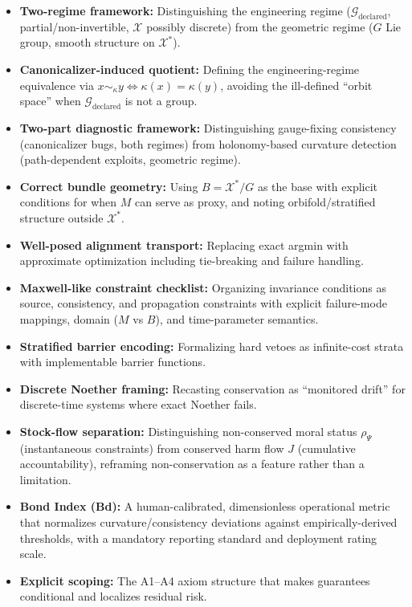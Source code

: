 \documentclass[12pt]{article}
\begin{document}
\begin{itemize}
\item \textbf{Two-regime framework:} Distinguishing the engineering regime ($\mathcal{G}_{\text{declared}}$, partial/non-invertible, $\mathcal{X}$ possibly discrete) from the geometric regime ($G$ Lie group, smooth structure on
$\mathcal{X}^*$).
\item \textbf{Canonicalizer-induced quotient:} Defining the engineering-regime equivalence via $x \sim_\kappa
y \Leftrightarrow \kappa(x) = \kappa(y)$, avoiding the ill-defined ``orbit space'' when $\mathcal{G}_{\text{declared}}$ is not a group.
\item \textbf{Two-part diagnostic framework:} Distinguishing gauge-fixing consistency (canonicalizer
bugs, both regimes) from holonomy-based curvature detection (path-dependent exploits, geometric regime).
\item \textbf{Correct bundle geometry:} Using $B = \mathcal{X}^*/G$ as the base with explicit conditions for when
$M$ can serve as proxy, and noting orbifold/stratified structure outside $\mathcal{X}^*$.
\item \textbf{Well-posed alignment transport:} Replacing exact argmin with approximate optimization
including tie-breaking and failure handling.
\item \textbf{Maxwell-like constraint checklist:} Organizing invariance conditions as source, consistency, and propagation constraints with explicit failure-mode mappings, domain ($M$ vs $B$),
and time-parameter semantics.
\item \textbf{Stratified barrier encoding:} Formalizing hard vetoes as infinite-cost strata with implementable barrier functions.
\item \textbf{Discrete Noether framing:} Recasting conservation as ``monitored drift'' for discrete-time
systems where exact Noether fails.
\item \textbf{Stock-flow separation:} Distinguishing non-conserved moral status $\rho_\Psi$ (instantaneous constraints) from conserved harm flow $J$ (cumulative accountability), reframing non-conservation
as a feature rather than a limitation.
\item \textbf{Bond Index (Bd):} A human-calibrated, dimensionless operational metric that normalizes
curvature/consistency deviations against empirically-derived thresholds, with a mandatory
reporting standard and deployment rating scale.
\item \textbf{Explicit scoping:} The A1--A4 axiom structure that makes guarantees conditional and localizes residual risk.
\end{itemize}
\end{document}
